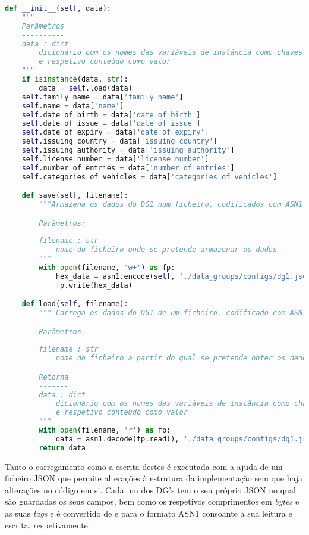 \begin{lstlisting}[language=Python, caption=Exemplos de funções de inicialização\, escrita e carregamento de dados no DG1]
    def __init__(self, data):
    """
    Parâmetros
    ----------
    data : dict
        dicionário com os nomes das variáveis de instância como chaves
        e respetivo conteúdo como valor
    """
    if isinstance(data, str):
        data = self.load(data)
    self.family_name = data['family_name']
    self.name = data['name']
    self.date_of_birth = data['date_of_birth']
    self.date_of_issue = data['date_of_issue']
    self.date_of_expiry = data['date_of_expiry']
    self.issuing_country = data['issuing_country']
    self.issuing_authority = data['issuing_authority']
    self.license_number = data['license_number']
    self.number_of_entries = data['number_of_entries']
    self.categories_of_vehicles = data['categories_of_vehicles']

    def save(self, filename):
        """Armazena os dados do DG1 num ficheiro, codificados com ASN1.

        Parâmetros:
        -----------
        filename : str
            nome do ficheiro onde se pretende armazenar os dados
        """
        with open(filename, 'w+') as fp:
            hex_data = asn1.encode(self, './data_groups/configs/dg1.json')
            fp.write(hex_data)

    def load(self, filename):
        """ Carrega os dados do DG1 de um ficheiro, codificado com ASN1.

        Parâmetros
        ----------
        filename : str
            nome do ficheiro a partir do qual se pretende obter os dados

        Retorna
        -------
        data : dict
            dicionário com os nomes das variáveis de instância como chaves
            e respetivo conteúdo como valor
        """
        with open(filename, 'r') as fp:
            data = asn1.decode(fp.read(), './data_groups/configs/dg1.json')
        return data
\end{lstlisting}

Tanto o carregamento como a escrita destes é executada com a ajuda de um ficheiro JSON que permite alterações à estrutura da implementação sem que haja alterações no código em si. Cada um dos DG's tem o seu próprio JSON no qual são guardadas os seus campos, bem como os respetivos comprimentos em \textit{bytes} e as suas \textit{tags} e é convertido de e para o formato ASN1 consoante a sua leitura e escrita, respetivamente.

